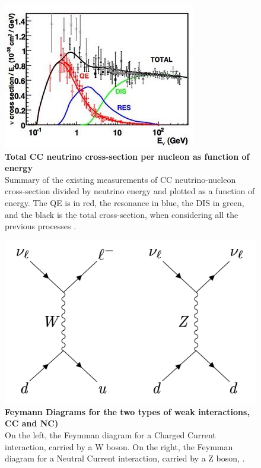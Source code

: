 \begin{figure}
	\begin{center}
		\includegraphics[scale=0.8]{Figures/nu_scatter.jpg}
		\caption[nu_scatter]{ {\textbf{Total CC neutrino cross-section per nucleon as function of energy}} \\ Summary of the existing measurements of CC neutrino-nucleon cross-section divided by neutrino energy and plotted as a function of energy. The QE is in red, the resonance in blue, the DIS in green, and the black is the total cross-section, when considering all the previous processes \cite{nu_scatter_zeller}.}
		\label{nu_scatter}	
	\end{center}
\end{figure}

\begin{figure}
	\begin{center}
		\includegraphics[scale=0.8]{Figures/feymann_diag.jpg}
		\caption[feymann_diag]{ {\textbf{Feymann Diagrams for the two types of weak interactions, CC and NC)}} \\ On the left, the Feymman diagram for a Charged Current interaction, carried by a W boson. On the right, the Feymman diagram for a Neutral Current interaction, carried by a Z boson, \cite{Lauren_thesis}.}
		\label{nu_scatter}	
	\end{center}
\end{figure}

